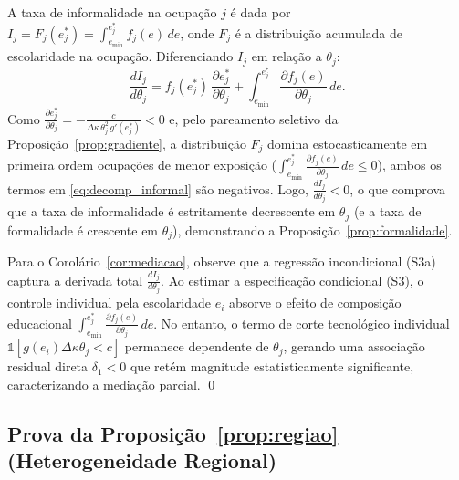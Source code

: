 A taxa de informalidade na ocupação $j$ é dada por $I_j = F_j(e^*_j) = \int_{e_{\min}}^{e^*_j} f_j(e) \, de$, onde $F_j$ é a distribuição acumulada de escolaridade na ocupação. Diferenciando $I_j$ em relação a $\theta_j$:
\begin{equation}
    \frac{d I_j}{d \theta_j} = f_j(e^*_j) \, \frac{\partial e^*_j}{\partial \theta_j}
    + \int_{e_{\min}}^{e^*_j} \frac{\partial f_j(e)}{\partial \theta_j} \, de.
    \label{eq:decomp_informal}
\end{equation}
Como $\frac{\partial e^*_j}{\partial \theta_j} = -\frac{c}{\Delta\kappa \, \theta_j^2 \, g'(e^*_j)} < 0$ e, pelo pareamento seletivo da Proposição~\ref{prop:gradiente}, a distribuição $F_j$ domina estocasticamente em primeira ordem ocupações de menor exposição ($\int_{e_{\min}}^{e^*_j} \frac{\partial f_j(e)}{\partial \theta_j} \, de \le 0$), ambos os termos em \eqref{eq:decomp_informal} são negativos. Logo, $\frac{d I_j}{d \theta_j} < 0$, o que comprova que a taxa de informalidade é estritamente decrescente em $\theta_j$ (e a taxa de formalidade é crescente em $\theta_j$), demonstrando a Proposição~\ref{prop:formalidade}.

Para o Corolário~\ref{cor:mediacao}, observe que a regressão incondicional (S3a) captura a derivada total $\frac{d I_j}{d \theta_j}$. Ao estimar a especificação condicional (S3), o controle individual pela escolaridade $e_i$ absorve o efeito de composição educacional $\int_{e_{\min}}^{e^*_j} \frac{\partial f_j(e)}{\partial \theta_j} \, de$. No entanto, o termo de corte tecnológico individual $\mathbb{1}[g(e_i)\Delta\kappa\theta_j < c]$ permanece dependente de $\theta_j$, gerando uma associação residual direta $\delta_1 < 0$ que retém magnitude estatisticamente significante, caracterizando a mediação parcial. \qed

\subsection{Prova da Proposição~\ref{prop:regiao} (Heterogeneidade Regional)}


